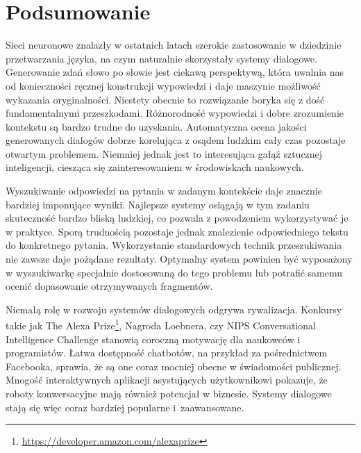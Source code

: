 
\setlength{\abovedisplayskip}{20pt}
\setlength{\belowdisplayskip}{20pt}

\chapter{Podsumowanie}

Sieci neuronowe znalazły w ostatnich latach szerokie zastosowanie w dziedzinie przetwarzania języka, na czym naturalnie skorzystały systemy dialogowe. Generowanie zdań słowo po słowie jest ciekawą perspektywą, która uwalnia nas od konieczności ręcznej konstrukcji wypowiedzi i daje maszynie możliwość wykazania oryginalności. Niestety obecnie to rozwiązanie boryka się z dość fundamentalnymi przeszkodami. Różnorodność wypowiedzi i dobre zrozumienie kontekstu są bardzo trudne do uzyskania. Automatyczna ocena jakości generowanych dialogów dobrze korelująca z osądem ludzkim cały czas pozostaje otwartym problemem. Niemniej jednak jest to interesująca gałąź sztucznej inteligencji, ciesząca się zainteresowaniem w środowiskach naukowych.

Wyszukiwanie odpowiedzi na pytania w zadanym kontekście daje znacznie bardziej imponujące wyniki. Najlepsze systemy osiągają w tym zadaniu skuteczność bardzo bliską ludzkiej, co pozwala z powodzeniem wykorzystywać je w praktyce. Sporą trudnością pozostaje jednak znalezienie odpowiedniego tekstu do konkretnego pytania. Wykorzystanie standardowych technik przeszukiwania nie zawsze daje pożądane rezultaty. Optymalny system powinien być wyposażony w wyszukiwarkę specjalnie dostosowaną do tego problemu lub potrafić samemu ocenić dopasowanie otrzymywanych fragmentów.

Niemałą rolę w rozwoju systemów dialogowych odgrywa rywalizacja. Konkursy takie jak The Alexa Prize\footnote{\url{https://developer.amazon.com/alexaprize}}, Nagroda Loebnera, czy NIPS Conversational Intelligence Challenge stanowią coroczną motywację dla naukowców i programistów. Łatwa dostępność chatbotów, na przykład za pośrednictwem Facebooka, sprawia, że są one coraz mocniej obecne w świadomości publicznej. Mnogość interaktywnych aplikacji asystujących użytkownikowi pokazuje, że roboty konwersacyjne mają również potencjał w biznesie. Systemy dialogowe stają się więc coraz bardziej popularne i~zaawansowane.